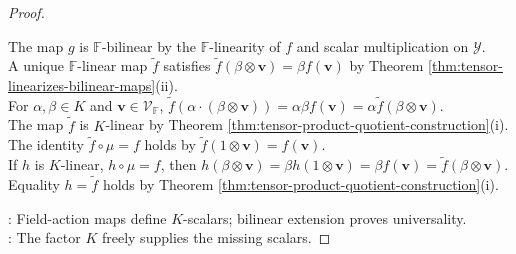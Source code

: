 \begin{proposition}
\begin{proof}
\begin{enumerate}[label=(\roman*)]
The map $g$ is $\mathbb{F}$-bilinear by the $\mathbb{F}$-linearity of $f$ and scalar multiplication on $\mathcal{Y}$.\\
A unique $\mathbb{F}$-linear map $\widetilde{f}$ satisfies $\widetilde{f}(\beta\otimes\mathbf{v})=\beta f(\mathbf{v})$ by Theorem \ref{thm:tensor-linearizes-bilinear-maps}(ii).\\
For $\alpha,\beta\in K$ and $\mathbf{v}\in\mathcal{V}_{\mathbb{F}}$, $\widetilde{f}(\alpha\cdot(\beta\otimes\mathbf{v}))=\alpha\beta f(\mathbf{v})=\alpha\widetilde{f}(\beta\otimes\mathbf{v})$.\\
The map $\widetilde{f}$ is $K$-linear by Theorem \ref{thm:tensor-product-quotient-construction}(i). The identity $\widetilde{f}\circ\mu=f$ holds by $\widetilde{f}(1\otimes\mathbf{v})=f(\mathbf{v})$.\\
If $h$ is $K$-linear, $h\circ\mu=f$, then $h(\beta\otimes\mathbf{v})=\beta h(1\otimes\mathbf{v})=\beta f(\mathbf{v})=\widetilde{f}(\beta\otimes\mathbf{v})$. Equality $h=\widetilde{f}$ holds by Theorem \ref{thm:tensor-product-quotient-construction}(i).
\end{enumerate}
: Field-action maps define $K$-scalars; bilinear extension proves universality.\\
: The factor $K$ freely supplies the missing scalars.
\end{proof}
\end{proposition}
